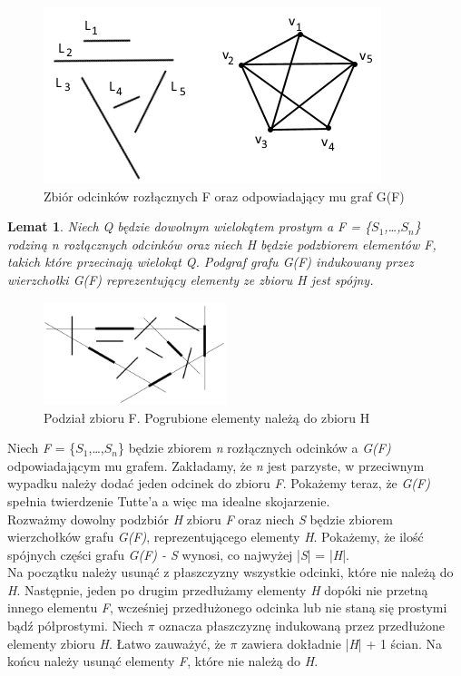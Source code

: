 \documentclass[brudnopis]{xmgr}
\newtheorem{Lemat}{Lemat}
\begin{document}
\begin{figure}[ht!]\label{zbior odcinkow rozlacznych}
 \centering
  \includegraphics{rysunki/g_f.png}
  \caption{Zbiór odcinków rozłącznych F oraz odpowiadający mu graf G(F)}
\end{figure} 

\begin{Lemat}\label{podgraf indukowany}
Niech Q będzie dowolnym wielokątem prostym a F = \{$S_1$,\ldots,$S_n$\} rodziną n rozłącznych odcinków oraz niech H będzie podzbiorem elementów F, takich które przecinają wielokąt Q. Podgraf grafu G(F) indukowany przez wierzchołki G(F) reprezentujący elementy ze zbioru H jest spójny.
\end{Lemat}
\begin{figure}[ht!]
 \centering
  \includegraphics[height=3cm]{rysunki/podzial_h.png}
  \caption{Podział zbioru F. Pogrubione elementy należą do zbioru H}
\end{figure} 
Niech \textit{F} = \{$S_1$,\ldots,$S_n$\} będzie zbiorem \textit{n} rozłącznych odcinków a \textit{G(F)} odpowiadającym mu grafem. Zakładamy, że \textit{n} jest parzyste, w przeciwnym wypadku należy dodać jeden odcinek do zbioru \textit{F}. Pokażemy teraz, że \textit{G(F)} spełnia twierdzenie Tutte'a a więc ma idealne skojarzenie.
\\\indent Rozważmy dowolny podzbiór \textit{H} zbioru \textit{F} oraz niech \textit{S} będzie zbiorem wierzchołków grafu \textit{G(F)}, reprezentującego elementy \textit{H}. Pokażemy, że ilość spójnych części grafu \textit{G(F) - S} wynosi, co najwyżej |\textit{S}| = |\textit{H}|.
\\\indent Na początku należy usunąć z płaszczyzny wszystkie odcinki, które nie należą do \textit{H}. Następnie, jeden po drugim przedłużamy elementy \textit{H} dopóki nie przetną innego elementu \textit{F}, wcześniej przedłużonego odcinka lub nie staną się prostymi bądź półprostymi. Niech $\pi$ oznacza płaszczyznę indukowaną przez przedłużone elementy zbioru \textit{H}. Łatwo zauważyć, że $\pi$ zawiera dokładnie |\textit{H}| + 1 ścian. Na końcu należy usunąć elementy \textit{F}, które nie należą do \textit{H}.
\end{document}
